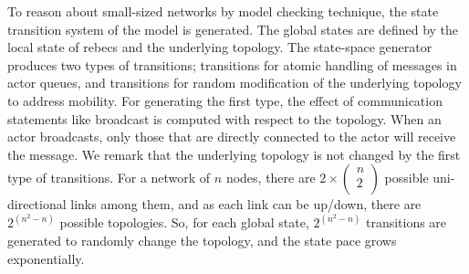 To reason about small-sized networks by model checking technique, the state transition system of the model is generated. The global states %
are defined by the local state of rebecs and the underlying topology. The state-space generator produces two types of transitions; transitions for atomic handling of messages in actor queues, and transitions for random modification of the underlying topology to address mobility. For generating the first type, the effect of communication statements like broadcast is computed with respect to the topology. When an actor broadcasts, only those that are directly connected to the actor will receive the message. We remark that the underlying topology is not changed by the first type of transitions.   %
For a network of $n$ nodes, there are $2\times \begin{pmatrix}
n \\
2 \\
\end{pmatrix}$ possible uni-directional links among them, and as each link can be up/down, there are $2^{(n^2-n)}$ possible topologies. %
So, for each global state, $2^{(n^2-n)}$ transitions are generated to randomly change the topology, and the state pace grows exponentially. %

